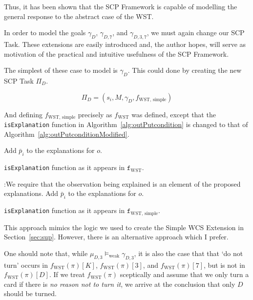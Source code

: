Thus, it has been shown that the SCP Framework is capable of modelling the general response to the abstract case of the WST.


In order to model the goals $\gamma_{D}$, $\gamma_{D,7}$, and $\gamma_{D,3,7}$, we must again change our SCP Task. These extensions are easily introduced and, the author hopes, will serve as motivation of the practical and intuitive usefulness of the SCP Framework.

The simplest of these case to model is  $\gamma_{D}$. This could done by creating the new SCP Task $\Pi_D$.

\[
\Pi_D = (s_i, M, \gamma_D, f_\text{WST, simple})
\]

And defining $f_\text{WST, simple}$ precisely as $f_\text{WST}$ was defined, except that the \texttt{isExplanation} function in Algorithm~\ref{alg:outPutcondition} is changed to that of 
Algorithm~\ref{alg:outPutconditionModified}.

\begin{algorithm}[H] 
\SetAlgoLined
{}
{
{
{
Add $\bar{p}_i$ to the explanations for $o$.
}
}
}
\caption{\texttt{isExplanation} function as it appears in $\texttt{f}_\text{WST}$.}
\label{alg:outPutcondition}
\end{algorithm}

\begin{algorithm}[H] 
\SetAlgoLined
{}
{
{
\tcc:{We require that the observation being explained is an element of the proposed explanations.}
{
Add $\bar{p}_i$ to the explanations for $o$.
}
}
}
\caption{\texttt{isExplanation} function as it appears in $\texttt{f}_\text{WST, simple}$.}
\label{alg:outPutconditionModified}
\end{algorithm}

This approach mimics the logic we used to create the Simple WCS Extension in Section~\ref{sec:sup}. However, there is an alternative approach which I prefer. 

One should note that, while $\mu_{D,3}\models_\text{weak} \gamma_{D,3}$, it is also the case that that `do not turn' occurs in $f_\text{WST}(\pi)[K]$, $f_\text{WST}(\pi)[3]$, and $ f_\text{WST}(\pi)[7]$, but is not in $ f_\text{WST}(\pi)[D]$. If we treat $f_\text{WST}(\pi)$ sceptically and assume that we only turn a card if there is \textit{no reason not to turn it}, we arrive at the conclusion that only $D$ should be turned.

